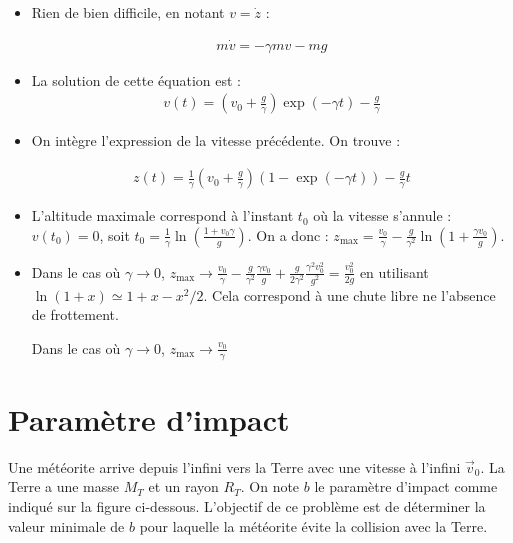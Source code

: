 \documentclass{report}
\begin{document}
\begin{itemize}
\item Rien de bien difficile, en notant $v=\dot{z}$ :

\begin{align*}
	m\dot{v}=-\gamma mv-mg
\end{align*}

\item
La solution de cette équation est :
\begin{align*}
	v(t) = \left(v_0+\frac{g}{\gamma} \right)\exp\left(-\gamma t\right)-\frac{g}{\gamma}  
\end{align*}

\item On intègre l'expression de la vitesse précédente. On trouve :

\begin{align*}
	z(t) = \frac{1}{\gamma}\left(v_0+\frac{g}{\gamma} \right) \left(1-\exp(-\gamma t) \right) -\frac{g}{\gamma}t
\end{align*}
\item L'altitude maximale correspond à l'instant $t_0$ où la vitesse s'annule : $v(t_0)=0$, soit $t_0 = \frac{1}{\gamma}\ln\left(\frac{1+v_0\gamma}{g} \right) $. On a donc :
$z_\mathrm{max}=\frac{v_0}{\gamma}-\frac{g}{\gamma^2}\ln\left( 1+\frac{\gamma v_0}{g}\right).$

\item Dans le cas où $\gamma\rightarrow0$, $z_\mathrm{max}\rightarrow\frac{v_0}{\gamma}-\frac{g}{\gamma^2}\frac{\gamma v_0}{g}+\frac{g}{2\gamma^2}\frac{\gamma^2 v_0^2}{g^2}=\frac{ v_0^2}{2g}$ en utilisant $\ln(1+x)\simeq 1+x-x^2/2$. Cela correspond à une chute libre ne l'absence de frottement. 

Dans le cas où $\gamma\rightarrow0$, $z_\mathrm{max}\rightarrow\frac{v_0}{\gamma}$

\end{itemize}

\newpage

\section*{Paramètre d'impact}

Une météorite arrive depuis l'infini vers la Terre avec une vitesse à l'infini $\vec{v}_0$. La Terre a une masse $M_T$ et un rayon $R_T$. On note $b$ le paramètre d'impact comme indiqué sur la figure ci-dessous. L'objectif de ce problème est de déterminer la valeur minimale de $b$ pour laquelle la météorite évite la collision avec la Terre.
\end{document}
